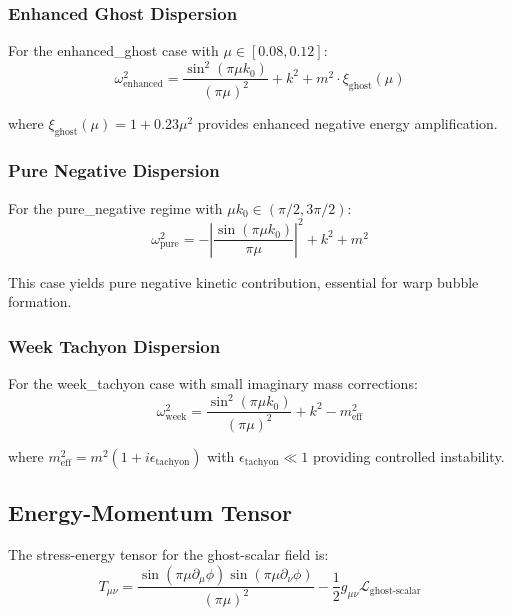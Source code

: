 \subsubsection{Enhanced Ghost Dispersion}

For the enhanced_ghost case with $\mu \in [0.08, 0.12]$:
\begin{equation}
\omega^2_{\text{enhanced}} = \frac{\sin^2(\pi\mu k_0)}{(\pi\mu)^2} + k^2 + m^2 \cdot \xi_{\text{ghost}}(\mu)
\end{equation}

where $\xi_{\text{ghost}}(\mu) = 1 + 0.23\mu^2$ provides enhanced negative energy amplification.

\subsubsection{Pure Negative Dispersion}

For the pure_negative regime with $\mu k_0 \in (\pi/2, 3\pi/2)$:
\begin{equation}
\omega^2_{\text{pure}} = -\left|\frac{\sin(\pi\mu k_0)}{\pi\mu}\right|^2 + k^2 + m^2
\end{equation}

This case yields pure negative kinetic contribution, essential for warp bubble formation.

\subsubsection{Week Tachyon Dispersion}

For the week_tachyon case with small imaginary mass corrections:
\begin{equation}
\omega^2_{\text{week}} = \frac{\sin^2(\pi\mu k_0)}{(\pi\mu)^2} + k^2 - m_{\text{eff}}^2
\end{equation}

where $m_{\text{eff}}^2 = m^2(1 + i\epsilon_{\text{tachyon}})$ with $\epsilon_{\text{tachyon}} \ll 1$ providing controlled instability.

\subsection{Energy-Momentum Tensor}

The stress-energy tensor for the ghost-scalar field is:
\begin{equation}
T_{\mu\nu} = \frac{\sin(\pi\mu\partial_\mu\phi)\sin(\pi\mu\partial_\nu\phi)}{(\pi\mu)^2} - \frac{1}{2}g_{\mu\nu}\mathcal{L}_{\text{ghost-scalar}}
\end{equation}

